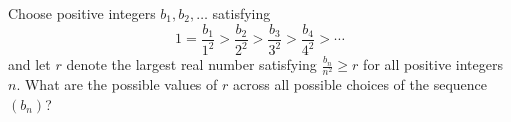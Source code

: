 Choose positive integers $b_1, b_2, \dotsc$ satisfying\[1=\frac{b_1}{1^2} > \frac{b_2}{2^2} > \frac{b_3}{3^2} > \frac{b_4}{4^2} > \dotsb\]and let $r$ denote the largest real number satisfying $\tfrac{b_n}{n^2} \geq r$ for all positive integers $n$. What are the possible values of $r$ across all possible choices of the sequence $(b_n)$?
